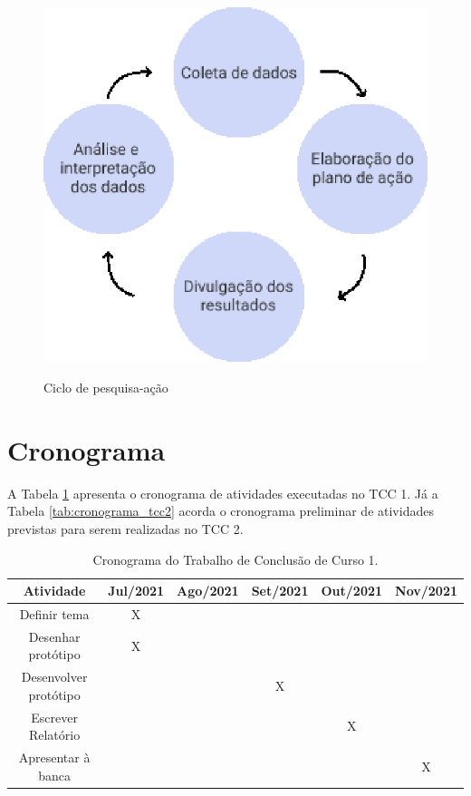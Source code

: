     \begin{figure}[!h]
    	\centering
    	\caption{Ciclo de pesquisa-ação}
    	\includegraphics[keepaspectratio=true,scale=0.6]{figuras/ciclo_gil.eps}
    	\label{fig11}
    \end{figure}
    
\section{Cronograma}

A Tabela \ref{tab:cronograma_tcc} apresenta o cronograma de atividades executadas no TCC 1. Já a Tabela \ref{tab:cronograma_tcc2} acorda o cronograma preliminar de atividades previstas para serem realizadas no TCC 2.

\begin{table}[!h]
    \centering
    \caption{Cronograma do Trabalho de Conclusão de Curso 1.}
    \label{tab:cronograma_tcc}
    \begin{tabular} {c|c|c|c|c|c}
    \hline
        \textbf{Atividade} & \textbf{Jul/2021} & \textbf{Ago/2021} & \textbf{Set/2021} & \textbf{Out/2021} & \textbf{Nov/2021} \\
        \hline
        Definir tema & X &  &  &  &  \\
        \hline
        Desenhar protótipo  &  X & &  &  &  \\
        \hline
        Desenvolver protótipo  &  & & X  &  &  \\
        \hline
        Escrever Relatório  &  &  &  &  X &  \\
        \hline
        Apresentar à banca   &  &  &  &  & X \\
        \hline
    \end{tabular}
    \label{tab:cronograma_tcc}
\end{table}

